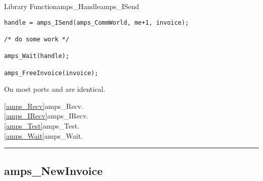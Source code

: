 \begin{deftypefn}{Library Function}{amps_Handle}{amps\_ISend}
\begin{display}
\begin{verbatim}
handle = amps_ISend(amps_CommWorld, me+1, invoice);

/* do some work */

amps_Wait(handle);

amps_FreeInvoice(invoice);

\end{verbatim}\end{display}

\NOTES

On most ports  and  are identical.

\SEEALSO
\vref{amps_Recv}{amps\_Recv}. \\
\vref{amps_IRecv}{amps\_IRecv}. \\
\vref{amps_Test}{amps\_Test}. \\
\vref{amps_Wait}{amps\_Wait}. \\

\end{deftypefn}



\noindent\rule{\textwidth}{1mm}

\subsection{amps\_NewInvoice}
\label{amps_NewInvoice}


